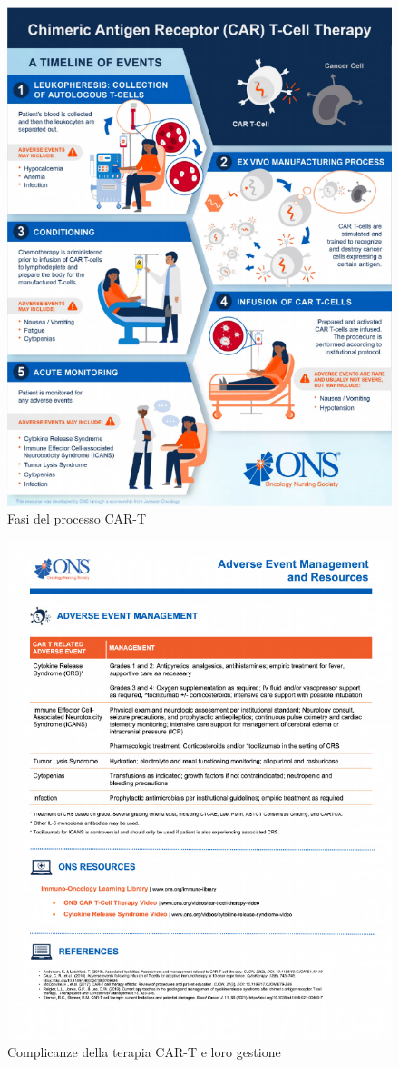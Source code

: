 \begin{figure}[H]
    \begin{center}
    \vspace{-3mm}
    \includegraphics[width=0.7\columnwidth]{img/onsCAR-T.png}
    \end{center}
    \caption{Fasi del processo CAR-T
    \cite{ONSCART}}

\end{figure}

\begin{figure}[H]
    \begin{center}
    \vspace{-3mm}
    \includegraphics[width=0.7\columnwidth]{img/ONS.png}
    \end{center}
    \caption{Complicanze della terapia CAR-T e loro gestione
    \cite{ONSCART}}

\end{figure}

